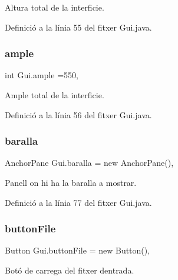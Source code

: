 Altura total de la interficie. 



Definició a la línia 55 del fitxer Gui.\+java.

\mbox{\label{class_gui_a872c30141e879159a1c3d9958918fecd}} 
\subsubsection{\texorpdfstring{ample}{ample}}
{\footnotesize\ttfamily int Gui.\+ample =550\hspace{0.3cm}{\ttfamily [static]}, {\ttfamily [private]}}



Ample total de la interficie. 



Definició a la línia 56 del fitxer Gui.\+java.

\mbox{\label{class_gui_a6f0b7608a67268ba19c503871178428e}} 
\subsubsection{\texorpdfstring{baralla}{baralla}}
{\footnotesize\ttfamily Anchor\+Pane Gui.\+baralla = new Anchor\+Pane()\hspace{0.3cm}{\ttfamily [static]}, {\ttfamily [private]}}



Panell on hi ha la baralla a mostrar. 



Definició a la línia 77 del fitxer Gui.\+java.

\mbox{\label{class_gui_a2f3232db85811350d923ff914cc0ac27}} 
\subsubsection{\texorpdfstring{button\+File}{buttonFile}}
{\footnotesize\ttfamily Button Gui.\+button\+File = new Button()\hspace{0.3cm}{\ttfamily [static]}, {\ttfamily [private]}}



Botó de carrega del fitxer d\textquotesingle{}entrada. 



